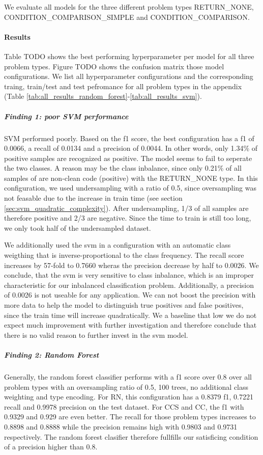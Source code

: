 We evaluate all models for the three different problem types RETURN\_NONE, CONDITION\_COMPARISON\_SIMPLE and CONDITION\_COMPARISON.

\paragraph{Results}
Table TODO shows the best performing hyperparameter per model for all three problem types. Figure TODO shows the confusion matrix those model configurations. We list all hyperparameter configurations and the corresponding traing, train/test and test pefromance for all problem types in the appendix (Table \ref{tab:all_results_random_forest}-\ref{tab:all_results_svm}).




\subparagraph{Finding 1: poor SVM performance}
SVM performed poorly. Based on the f1 score, the best configuration has a f1 of 0.0066, a recall of 0.0134 and a precision of 0.0044. In other words, only 1.34\% of positive samples are recognized as positive. The model seems to fail to seperate the two classes. A reason may be the class inbalance, since only 0.21\% of all samples of are non-clean code (positive) with the RETURN\_NONE type. In this configuration, we used undersampling with a ratio of 0.5, since oversampling was not feasable due to the increase in train time (see section \ref{sec:svm_quadratic_complexity}). After undersampling, 1/3 of all samples are therefore positive and 2/3 are negative. Since the time to train is still too long, we only took half of the undersampled dataset. 

We additionally used the svm in a configuration with an automatic class weigthing that is inverse-proportional to the class frequency. The recall score increases by 57-fold to 0.7660 wheras the precision decrease by half to 0.0026. We conclude, that the svm is very sensitive to class inbalance, which is an improper characteristic for our inbalanced classification problem. Additionally, a precision of 0.0026 is not useable for any application. We can not boost the precision with more data to help the model to distinguish true positives and false positives, since the train time will increase quadratically. We a baseline that low we do not expect much improvement with further investigation and therefore conclude that there is no valid reason to further invest in the svm model.


\subparagraph{Finding 2: Random Forest}
Generally, the random forest classifier performs with a f1 score over 0.8 over all problem types with an oversampling ratio of 0.5, 100 trees, no additional class weighting and type encoding. For RN, this configuration has a 0.8379 f1, 0.7221 recall and 0.9978 precision on the test dataset. For CCS and CC, the f1 with 0.9329 and 0.929 are even better. The recall for those problem types increases to 0.8898 and 0.8888 while the precision remains high with 0.9803 and 0.9731 respectively. The random forest clasifier therefore fullfills our satisficing condition of a precision higher than 0.8.

